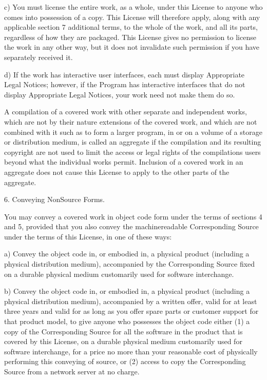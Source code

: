 \documentclass[letterpaper,10pt,english]{sphinxmanual}
\begin{document}
\begin{sphinxVerbatim}[commandchars=\\\{\}]
    c) You must license the entire work, as a whole, under this
    License to anyone who comes into possession of a copy.  This
    License will therefore apply, along with any applicable section 7
    additional terms, to the whole of the work, and all its parts,
    regardless of how they are packaged.  This License gives no
    permission to license the work in any other way, but it does not
    invalidate such permission if you have separately received it.

    d) If the work has interactive user interfaces, each must display
    Appropriate Legal Notices; however, if the Program has interactive
    interfaces that do not display Appropriate Legal Notices, your
    work need not make them do so.

  A compilation of a covered work with other separate and independent
works, which are not by their nature extensions of the covered work,
and which are not combined with it such as to form a larger program,
in or on a volume of a storage or distribution medium, is called an
\PYGZdq{}aggregate\PYGZdq{} if the compilation and its resulting copyright are not
used to limit the access or legal rights of the compilation\PYGZsq{}s users
beyond what the individual works permit.  Inclusion of a covered work
in an aggregate does not cause this License to apply to the other
parts of the aggregate.

  6. Conveying Non\PYGZhy{}Source Forms.

  You may convey a covered work in object code form under the terms
of sections 4 and 5, provided that you also convey the
machine\PYGZhy{}readable Corresponding Source under the terms of this License,
in one of these ways:

    a) Convey the object code in, or embodied in, a physical product
    (including a physical distribution medium), accompanied by the
    Corresponding Source fixed on a durable physical medium
    customarily used for software interchange.

    b) Convey the object code in, or embodied in, a physical product
    (including a physical distribution medium), accompanied by a
    written offer, valid for at least three years and valid for as
    long as you offer spare parts or customer support for that product
    model, to give anyone who possesses the object code either (1) a
    copy of the Corresponding Source for all the software in the
    product that is covered by this License, on a durable physical
    medium customarily used for software interchange, for a price no
    more than your reasonable cost of physically performing this
    conveying of source, or (2) access to copy the
    Corresponding Source from a network server at no charge.


\end{sphinxVerbatim}
\end{document}
